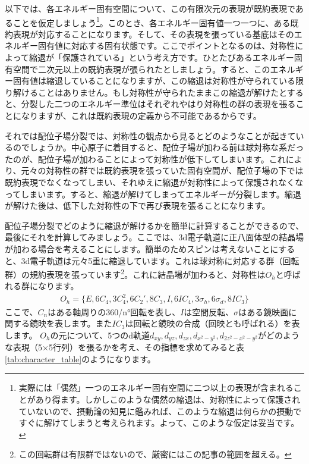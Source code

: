 \documentclass[uplatex,dvipdfmx,a4j,openany]{jsarticle}
\begin{document}
以下では、各エネルギー固有空間について、この有限次元の表現が既約表現であることを仮定しましょう\footnote{実際には「偶然」一つのエネルギー固有空間に二つ以上の表現が含まれることがあり得ます。しかしこのような偶然の縮退は、対称性によって保護されていないので、摂動論の知見に鑑みれば、このような縮退は何らかの摂動ですぐに解けてしまうと考えられます。よって、このような仮定は妥当です。}。このとき、各エネルギー固有値一つ一つに、ある既約表現が対応することになります。そして、その表現を張っている基底はそのエネルギー固有値に対応する固有状態です。ここでポイントとなるのは、対称性によって縮退が「保護されている」という考え方です。ひとたびあるエネルギー固有空間で二次元以上の既約表現が張られたとしましょう。すると、このエネルギー固有値は縮退していることになりますが、この縮退は対称性が守られている限り解けることはありません。もし対称性が守られたままこの縮退が解けたとすると、分裂した二つのエネルギー準位はそれぞれやはり対称性の群の表現を張ることになりますが、これは既約表現の定義から不可能であるからです。

それでは配位子場分裂では、対称性の観点から見るとどのようなことが起きているのでしょうか。中心原子に着目すると、配位子場が加わる前は球対称な系だったのが、配位子場が加わることによって対称性が低下してしまいます。これにより、元々の対称性の群では既約表現を張っていた固有空間が、配位子場の下では既約表現でなくなってしまい、それゆえに縮退が対称性によって保護されなくなってしまいます。すると、縮退が解けてしまってエネルギーが分裂します。縮退が解けた後は、低下した対称性の下で再び表現を張ることになります。

配位子場分裂でどのように縮退が解けるかを簡単に計算することができるので、最後にそれを計算してみましょう。ここでは、3d電子軌道に正八面体型の結晶場が加わる場合を考えることにします。簡単のためスピンは考えないことにすると、3d電子軌道は元々5重に縮退しています。これは球対称に対応する群（回転群）の規約表現を張っています\footnote{この回転群は有限群ではないので、厳密にはこの記事の範囲を超える。}。これに結晶場が加わると、対称性は$O_h$と呼ばれる群になります。
\begin{align}
	O_h = \{ E, 6C_4, 3C_4^2, 6C_2', 8C_3, I, 6IC_4, 3\sigma_h, 6\sigma_d, 8IC_3 \}
\end{align}
ここで、$C_n$はある軸周りの360/n°回転を表し、$I$は空間反転、$\sigma$はある鏡映面に関する鏡映を表します。また$IC_3$は回転と鏡映の合成（回映とも呼ばれる）を表します。
$O_h$の元について、5つのd軌道$d_{xy}, d_{yz}, d_{zx}, d_{x^2-y^2}, d_{2z^2-x^2-y^2}$がどのような表現（5×5行列）を張るかを考え、その指標を求めてみると表\ref{tab:character_table}のようになります。
\end{document}
